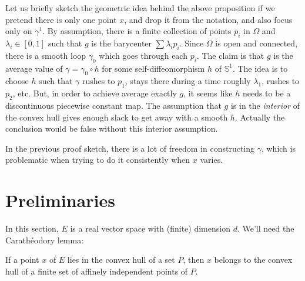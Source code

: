 Let us briefly sketch the geometric idea behind the above proposition
if we pretend there is only one point $x$, and drop it from the
notation, and also focus only on $γ^1$.
By assumption, there is a finite collection of points $p_i$ in $Ω$ and $λ_i ∈
[0, 1]$ such that $g$ is the barycenter $\sum λ_i p_i$. Since $Ω$ is open and
connected, there is a smooth loop $γ_0$ which goes through each $p_i$. The
claim is that $g$ is the average value of $γ = γ_0 ∘ h$ for some
self-diffeomorphism $h$ of $𝕊^1$. The idea is to choose $h$ such that
$γ$ rushes to $p_1$, stays there during a time roughly $λ_1$, rushes to
$p_2$, etc. But, in order to achieve average exactly $g$, it seems like $h$
needs to be a discontinuous piecewise constant map. The assumption that $g$ is
in the \emph{interior} of the convex hull gives enough slack to get away with
a smooth $h$.  Actually the
conclusion would be false without this interior assumption.

In the previous proof sketch, there is a lot of freedom in constructing $γ$,
which is problematic when trying to do it consistently when $x$ varies.

\section{Preliminaries}
\label{sec:preliminaries}

In this section, $E$ is a real vector space with (finite) dimension $d$.
We'll need the Carathéodory lemma:

\begin{lemma}
\label{lem:caratheodory}
\leanok
  If a point $x$ of $E$ lies in the convex hull of a set $P$, then $x$
  belongs to the convex hull of a finite set of affinely independent points
  of $P$.
\end{lemma}

